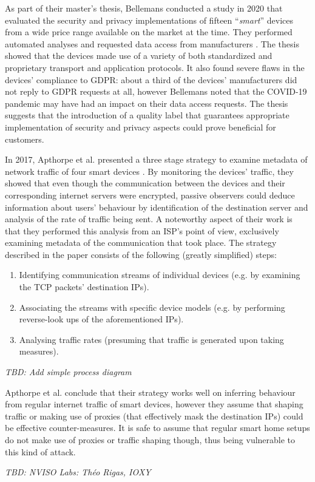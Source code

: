 As part of their master's thesis, Bellemans conducted a study in 2020 that evaluated the security and privacy implementations of fifteen \enquote{\emph{smart}} devices from a wide price range available on the market at the time. They performed automated analyses and requested data access from manufacturers \cite{JonahBellemans}. The thesis showed that the devices made use of a variety of both standardized and proprietary transport and application protocols. It also found severe flaws in the devices' compliance to \ac{GDPR}: about a third of the devices' manufacturers did not reply to \ac{GDPR} requests at all, however Bellemans noted that the COVID-19 pandemic may have had an impact on their data access requests. The thesis suggests that the introduction of a quality label that guarantees appropriate implementation of security and privacy aspects could prove beneficial for customers. \par
In 2017, Apthorpe et al. presented a three stage strategy to examine metadata of network traffic of four smart devices \cite{apthorpe2017smart}. %
By monitoring the devices' traffic, they showed that even though the communication between the devices and their corresponding internet servers were encrypted, passive observers could deduce information about users' behaviour by identification of the destination server and analysis of the rate of traffic being sent. A noteworthy aspect of their work is that they performed this analysis from an \ac{ISP}'s point of view, exclusively examining metadata of the communication that took place. The strategy described in the paper consists of the following (greatly simplified) steps:
\begin{enumerate}
    \item Identifying communication streams of individual devices (e.g. by examining the TCP packets' destination IPs).
    \item Associating the streams with specific device models (e.g. by performing reverse-look ups of the aforementioned IPs).
    \item Analysing traffic rates (presuming that traffic is generated upon taking measures).
\end{enumerate}
\emph{TBD: Add simple process diagram} %


Apthorpe et al. conclude that their strategy works well on inferring behaviour from regular internet traffic of smart devices, however they assume that shaping traffic or making use of proxies (that effectively mask the destination IPs) could be effective counter-measures. It is safe to assume that regular smart home setups do not make use of proxies or traffic shaping though, thus being vulnerable to this kind of attack. \par
\emph{TBD: NVISO Labs: Théo Rigas, IOXY \cite{rigas_ioxy}} %